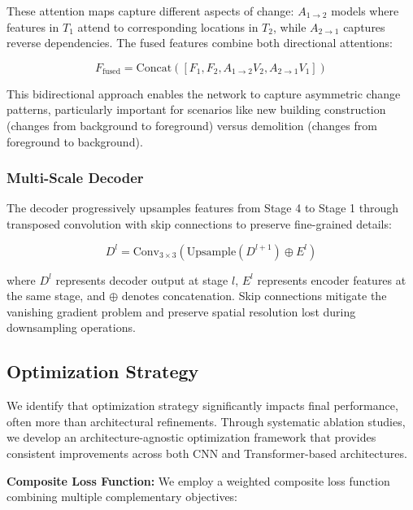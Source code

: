 \documentclass[journal]{IEEEtran}
\begin{document}
{These attention maps capture different aspects of change: $A_{1 \rightarrow 2}$ models where features in $T_1$ attend to corresponding locations in $T_2$, while $A_{2 \rightarrow 1}$ captures reverse dependencies. The fused features combine both directional attentions:

\begin{equation}
F_{\text{fused}} = \text{Concat}([F_1, F_2, A_{1 \rightarrow 2} V_2, A_{2 \rightarrow 1} V_1])
\label{eq:fusion}
\end{equation}

This bidirectional approach enables the network to capture asymmetric change patterns, particularly important for scenarios like new building construction (changes from background to foreground) versus demolition (changes from foreground to background).

\subsubsection{Multi-Scale Decoder}

The decoder progressively upsamples features from Stage 4 to Stage 1 through transposed convolution with skip connections to preserve fine-grained details:

\begin{equation}
D^l = \text{Conv}_{3\times 3}(\text{Upsample}(D^{l+1}) \oplus E^l)
\label{eq:decoder}
\end{equation}

where $D^l$ represents decoder output at stage $l$, $E^l$ represents encoder features at the same stage, and $\oplus$ denotes concatenation. Skip connections mitigate the vanishing gradient problem and preserve spatial resolution lost during downsampling operations.

\subsection{Optimization Strategy}

We identify that optimization strategy significantly impacts final performance, often more than architectural refinements. Through systematic ablation studies, we develop an architecture-agnostic optimization framework that provides consistent improvements across both CNN and Transformer-based architectures.

\textbf{Composite Loss Function:} We employ a weighted composite loss function combining multiple complementary objectives:

}
\end{document}
